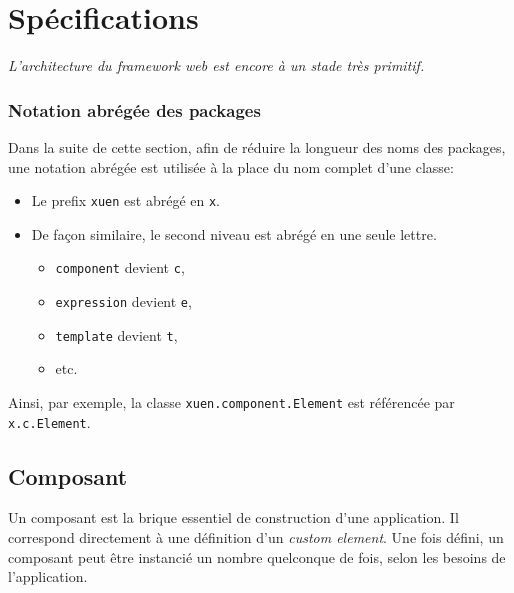 \section{Spécifications} \label{sec:web-specs}

\textit{L'architecture du framework web est encore à un stade très primitif.}

\subsubsection{Notation abrégée des packages}
Dans la suite de cette section, afin de réduire la longueur des noms des packages, une notation abrégée est utilisée à la place du nom complet d'une classe:
\begin{itemize}
	\item Le prefix \texttt{xuen} est abrégé en \texttt{x}.
	\item De façon similaire, le second niveau est abrégé en une seule lettre.
	\begin{itemize}
		\item \texttt{component} devient \texttt{c},
		\item \texttt{expression} devient \texttt{e},
		\item \texttt{template} devient \texttt{t},
		\item etc.
	\end{itemize}
\end{itemize}
Ainsi, par exemple, la classe \texttt{xuen.component.Element} est référencée par \texttt{x.c.Element}.

\subsection{Composant} \label{sec:web-usage-component}

Un composant est la brique essentiel de construction d'une application. Il correspond directement à une définition d'un \emph{custom element}. Une fois défini, un composant peut être instancié un nombre quelconque de fois, selon les besoins de l'application.


